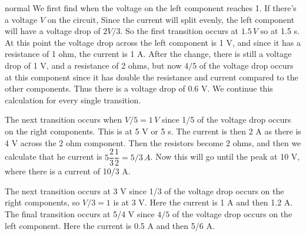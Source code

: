 \begin{solution}{normal}
We first find when the voltage on the left component reaches 1. If there's a voltage $V$ on the circuit, Since the current will split evenly, the left component will have a voltage drop of $2V/3$. So the first transition occurs at $1.5 \,V$ so at 1.5 s. At this point the voltage drop across the left component is 1 V, and since it has a resistance of 1 ohm, the current is 1 A. After the change, there is still a voltage drop of 1 V, and a resistance of 2 ohms, but now $4/5$ of the voltage drop occurs at this component since it has double the resistance and current compared to the other components. Thus there is a voltage drop of 0.6 V. We continue this calculation for every single transition.

The next transition occurs when $V/5 = 1\, V$ since 1/5 of the voltage drop occurs on the right components. This is at 5 V or 5 s. The current is then 2 A as there is 4 V across the 2 ohm component. Then the resistors become 2 ohms, and then we calculate that he current is $5\dfrac{2}{3}\dfrac{1}{2} = 5/3\, A$. Now this will go until the peak at 10 V, where there is a current of 10/3 A.

The next transition occurs at 3 V since 1/3 of the voltage drop occurs on the right components, so $V/3 = 1$ is at 3 V. Here the current is 1 A and then 1.2 A. The final transition occurs at 5/4 V since $4/5$ of the voltage drop occurs on the left component. Here the current is 0.5 A and then 5/6 A.
\end{solution}